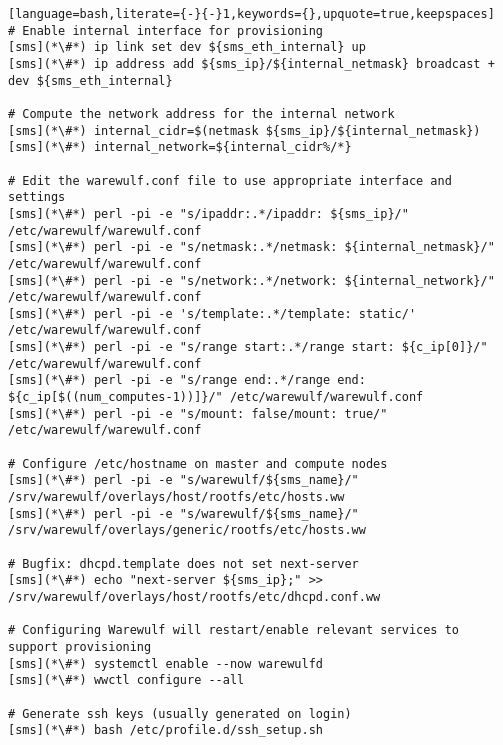 \begin{lstlisting}[language=bash,literate={-}{-}1,keywords={},upquote=true,keepspaces]
# Enable internal interface for provisioning
[sms](*\#*) ip link set dev ${sms_eth_internal} up
[sms](*\#*) ip address add ${sms_ip}/${internal_netmask} broadcast + dev ${sms_eth_internal}

# Compute the network address for the internal network
[sms](*\#*) internal_cidr=$(netmask ${sms_ip}/${internal_netmask})
[sms](*\#*) internal_network=${internal_cidr%/*}

# Edit the warewulf.conf file to use appropriate interface and settings
[sms](*\#*) perl -pi -e "s/ipaddr:.*/ipaddr: ${sms_ip}/" /etc/warewulf/warewulf.conf
[sms](*\#*) perl -pi -e "s/netmask:.*/netmask: ${internal_netmask}/" /etc/warewulf/warewulf.conf
[sms](*\#*) perl -pi -e "s/network:.*/network: ${internal_network}/" /etc/warewulf/warewulf.conf
[sms](*\#*) perl -pi -e 's/template:.*/template: static/' /etc/warewulf/warewulf.conf
[sms](*\#*) perl -pi -e "s/range start:.*/range start: ${c_ip[0]}/" /etc/warewulf/warewulf.conf
[sms](*\#*) perl -pi -e "s/range end:.*/range end: ${c_ip[$((num_computes-1))]}/" /etc/warewulf/warewulf.conf
[sms](*\#*) perl -pi -e "s/mount: false/mount: true/" /etc/warewulf/warewulf.conf

# Configure /etc/hostname on master and compute nodes
[sms](*\#*) perl -pi -e "s/warewulf/${sms_name}/" /srv/warewulf/overlays/host/rootfs/etc/hosts.ww
[sms](*\#*) perl -pi -e "s/warewulf/${sms_name}/" /srv/warewulf/overlays/generic/rootfs/etc/hosts.ww

# Bugfix: dhcpd.template does not set next-server
[sms](*\#*) echo "next-server ${sms_ip};" >> /srv/warewulf/overlays/host/rootfs/etc/dhcpd.conf.ww

# Configuring Warewulf will restart/enable relevant services to support provisioning
[sms](*\#*) systemctl enable --now warewulfd
[sms](*\#*) wwctl configure --all

# Generate ssh keys (usually generated on login)
[sms](*\#*) bash /etc/profile.d/ssh_setup.sh
\end{lstlisting}

